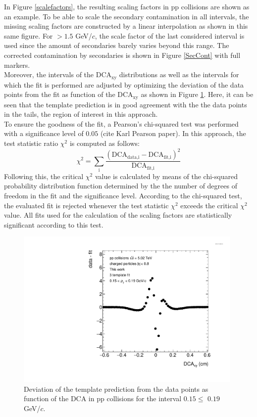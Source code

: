 \documentclass[12pt,a4paper]{report}
\begin{document}
In Figure \ref{scalefactors}, the resulting scaling factors in pp collisions are shown as an example. To be able to scale the secondary contamination in all \pt intervals, the missing scaling factors are constructed by a linear interpolation as shown in this same figure. For \pt $> 1.5$ GeV/$c$, the scale factor of the last considered \pt interval is used since the amount of secondaries barely varies beyond this range. The corrected contamination by secondaries is shown in Figure \ref{SecCont} with full markers.\\
Moreover, the intervals of the DCA$_{\text{xy}}$ distributions as well as the \pt intervals for which the fit is performed are adjusted by optimizing the deviation of the data points from the fit as function of the DCA$_{\text{xy}}$ as shown in Figure \ref{Pulls}. Here, it can be seen that the template prediction is in good agreement with the the data points in the tails, the region of interest in this approach.\\
To ensure the goodness of the fit, a Pearson's chi-squared test was performed with a significance level of $0.05$ (cite Karl Pearson paper). In this approach, the test statistic ratio $\chi^2$ is computed as follows:
\begin{equation}
\chi^2 = \sum_{\text{i}} \dfrac{(\text{DCA}_\text{data,i} - \text{DCA}_\text{fit,i})^2}{\text{DCA}_\text{fit,i}}
\end{equation}
Following this, the critical $\chi^2$ value is calculated by means of the chi-squared probability distribution function determined by the the number of degrees of freedom in the fit and the significance level. According to the chi-squared test, the evaluated fit is rejected whenever the test statistic $\chi^2$ exceeds the critical $\chi^2$ value. All fits used for the calculation of the scaling factors are statistically significant according to this test. 
\begin{figure}[tb!]
\centering
\includegraphics[width=11cm]{Plots/Pulls_Pt0_Mult0.pdf}  
\caption{Deviation of the template prediction from the data points as function of the DCA in pp collisions for the \pt interval $0.15 \leq$ \pt $0.19$ GeV/$c$.}
\label{Pulls}
\end{figure}
\end{document}
